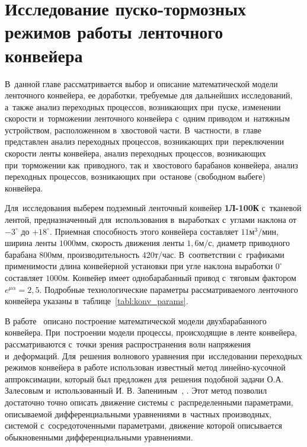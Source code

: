 
\chapter{Исследование пуско-тормозных режимов работы ленточного конвейера} \label{chapt3}
В~данной главе рассматривается выбор и описание математической модели ленточного конвейера, ее доработки, требуемые для дальнейших исследований, а~также анализ переходных процессов, возникающих при~пуске, изменении скорости и~торможении ленточного конвейера с~одним приводом и~натяжным устройством, расположенном в~хвостовой части. В~частности, в~главе представлен анализ переходных процессов, возникающих при~переключении скорости ленты конвейера, анализ переходных процессов, возникающих при~торможении как~приводного, так и~хвостового барабанов конвейера, анализ переходных процессов, возникающих при~останове (свободном выбеге) конвейера.

Для~исследования выберем подземный ленточный конвейер \textbf{1Л-100К} с~тканевой лентой, предназначенный для~использования в~выработках с~углами наклона от $-3^\circ$ до $+18^\circ$. Приемная способность этого конвейера составляет $11\text{м}^3/\text{мин}$, ширина ленты $1000\text{мм}$, скорость движения ленты $1,6\text{м/с}$, диаметр приводного барабана  $800\text{мм}$, производительность  $420\text{т/час}$. В~соответствии с~графиками применимости \cite{Aevnevich} длина конвейерной установки при угле наклона выработки $0^\circ$  составляет $1000\text{м}$. 
Конвейер имеет однобарабанный привод с~тяговым фактором $e^{\mu\alpha} = 2,5$. Подробные технологические параметры рассматриваемого ленточного конвейера указаны в~таблице~\ref{tabl:konv_params}.

В работе~\cite{vdmitrieva} описано построение математической модели двухбарабанного конвейера.
При~построении модели процессы, происходящие в ленте конвейера, рассматриваются с~точки зрения распространения волн напряжения и~деформаций. Для~решения волнового уравнения при~исследовании переходных режимов конвейера в работе использован известный метод линейно-кусочной аппроксимации, который был предложен для~решения подобной задачи О.А. Залесовым и~использованный И. В. Запениным~\cite{izapenin1}, \cite{izapenin2}. Этот метод позволил достаточно точно описать движение системы с~распределенными параметрами, описываемой дифференциальными уравнениями в~частных производных, системой с~сосредоточенными параметрами, движение которой описывается обыкновенными дифференциальными уравнениями.

